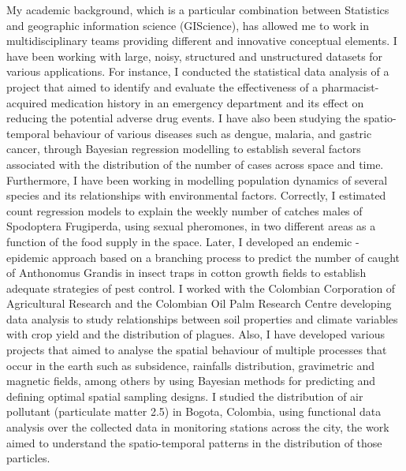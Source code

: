 \documentclass[11pt, a4paper]{awesome-cv}
\begin{document}
\begin{cvletter}
My academic background, which is a particular combination between Statistics and geographic information science (GIScience), has allowed me to work in multidisciplinary teams providing different and innovative conceptual elements. I have been working with large, noisy, structured and unstructured datasets for various applications. For instance, I conducted the statistical data analysis of a project that aimed to identify and evaluate the effectiveness of a pharmacist-acquired medication history in an emergency department and its effect on reducing the potential adverse drug events. I have also been studying the spatio-temporal behaviour of various diseases such as dengue, malaria, and gastric cancer, through Bayesian regression modelling to establish several factors associated with the distribution of the number of cases across space and time. Furthermore, I have been working in modelling population dynamics of several species and its relationships with environmental factors. Correctly, I estimated count regression models to explain the weekly number of catches males of Spodoptera Frugiperda, using sexual pheromones, in two different areas as a function of the food supply in the space. Later, I developed an endemic - epidemic approach based on a branching process to predict the number of caught of Anthonomus Grandis in insect traps in cotton growth fields to establish adequate strategies of pest control. I worked with the Colombian Corporation of Agricultural Research and the Colombian Oil Palm Research Centre developing data analysis to study relationships between soil properties and climate variables with crop yield and the distribution of plagues. Also, I have developed various projects that aimed to analyse the spatial behaviour of multiple processes that occur in the earth such as subsidence, rainfalls distribution, gravimetric and magnetic fields, among others by using Bayesian methods for predicting and defining optimal spatial sampling designs. I studied the distribution of air pollutant (particulate matter 2.5) in Bogota, Colombia, using functional data analysis over the collected data in monitoring stations across the city, the work aimed to understand the spatio-temporal patterns in the distribution of those particles.\par

\end{cvletter}
\end{document}
